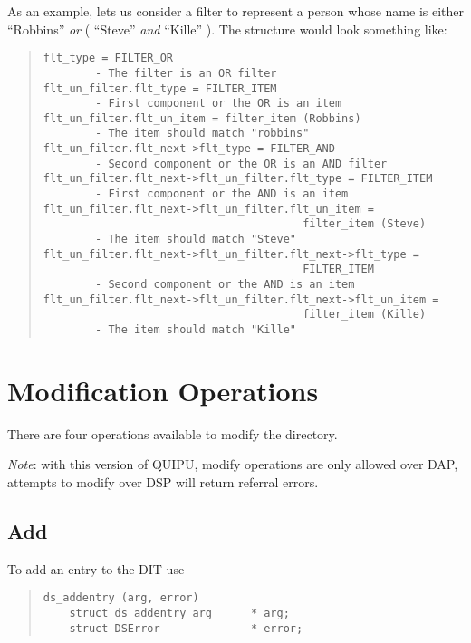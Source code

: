 As an example, lets us consider a filter to represent a person whose name
is either ``Robbins'' {\em or} ( ``Steve'' {\em and} ``Kille'' ).  The
structure would look something like:
\begin{small}
\begin{quote}\begin{verbatim}
flt_type = FILTER_OR
        - The filter is an OR filter
flt_un_filter.flt_type = FILTER_ITEM
        - First component or the OR is an item
flt_un_filter.flt_un_item = filter_item (Robbins)
        - The item should match "robbins"
flt_un_filter.flt_next->flt_type = FILTER_AND
        - Second component or the OR is an AND filter
flt_un_filter.flt_next->flt_un_filter.flt_type = FILTER_ITEM
        - First component or the AND is an item
flt_un_filter.flt_next->flt_un_filter.flt_un_item = 
                                        filter_item (Steve)
        - The item should match "Steve"
flt_un_filter.flt_next->flt_un_filter.flt_next->flt_type = 
                                        FILTER_ITEM
        - Second component or the AND is an item
flt_un_filter.flt_next->flt_un_filter.flt_next->flt_un_item = 
                                        filter_item (Kille)
        - The item should match "Kille"
\end{verbatim}\end{quote}
\end{small}
\section {Modification Operations}\label{mod-op}

There are four operations available to modify the directory.

{\em Note}: with this version of QUIPU, modify operations are only
allowed over DAP,
attempts to modify over DSP will return referral errors.

\subsection {Add}

To add an entry to the DIT use
\begin{quote}\small\begin{verbatim}
ds_addentry (arg, error)
    struct ds_addentry_arg      * arg;    
    struct DSError              * error;
\end{verbatim}\end{quote}

